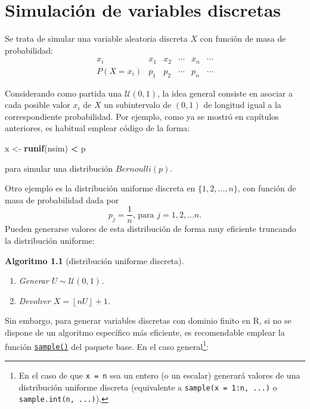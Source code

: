 \documentclass[
  spanish,
  10pt,
]{book}
\newenvironment{Shaded}{\begin{snugshade}}{\end{snugshade}}
\newcommand{\FunctionTok}[1]{\textcolor[rgb]{0.13,0.29,0.53}{\textbf{#1}}}
\newcommand{\NormalTok}[1]{#1}
\newcommand{\OtherTok}[1]{\textcolor[rgb]{0.56,0.35,0.01}{#1}}
\newcommand{\SpecialCharTok}[1]{\textcolor[rgb]{0.81,0.36,0.00}{\textbf{#1}}}
\theoremstyle{break}
\newtheorem{conjecture}{Algoritmo}[chapter]
\theoremstyle{nonumberplain}
\let\oldfootnote\footnote
\renewcommand\footnote[1]{\oldfootnote{\hspace{2mm}#1}}
\begin{document}
\chapter{Simulación de variables discretas}\label{discretas}

Se trata de simular una variable aleatoria discreta \(X\) con función de masa de
probabilidad:
\[\begin{array}{l|ccccc}
 x_{i}  &  x_{1}  &  x_{2}  &  \cdots   &  x_{n}  &  \cdots   \\ \hline
 P\left( X=x_{i}\right)   &  p_{1}  &  p_{2}  &  \cdots   &  p_{n}  &  
\cdots  
\end{array}\]

Considerando como partida una \(\mathcal{U}\left( 0,1\right)\), la
idea general consiste en asociar a cada posible valor \(x_{i}\) de \(X\)
un subintervalo de \(\left( 0,1\right)\) de longitud igual a la correspondiente
probabilidad.
Por ejemplo, como ya se mostró en capítulos anteriores, es habitual emplear
código de la forma:

\begin{Shaded}
\begin{Highlighting}[]
\NormalTok{x }\OtherTok{\textless{}{-}} \FunctionTok{runif}\NormalTok{(nsim) }\SpecialCharTok{\textless{}}\NormalTok{ p}
\end{Highlighting}
\end{Shaded}

para simular una distribución \(Bernoulli(p)\).

Otro ejemplo es la distribución uniforme discreta
en \(\{1,2,\ldots,n\}\), con función de masa de probabilidad dada por
\[p_{j}=\frac{1}{n}\text{, para }j=1,2,\ldots n.\]
Pueden generarse valores de esta distribución de forma muy eficiente truncando la distribución uniforme:

\begin{conjecture}[distribución uniforme discreta]
\protect\hypertarget{cnj:unif-discr}{}\label{cnj:unif-discr}

\begin{enumerate}
\def\labelenumi{\arabic{enumi}.}
\item
  Generar \(U\sim \mathcal{U}\left( 0,1\right)\).
\item
  Devolver \(X=\left\lfloor nU\right\rfloor + 1\).
\end{enumerate}

\end{conjecture}

Sin embargo, para generar variables discretas con dominio finito en R, si no se dispone de un algoritmo específico más eficiente, es recomendable emplear la función \href{https://rdrr.io/r/base/sample.html}{\texttt{sample()}} del paquete base.
En el caso general\footnote{En el caso de que \texttt{x\ =\ n} sea un entero (o un escalar) generará valores de una distribución uniforme discreta (equivalente a \texttt{sample(x\ =\ 1:n,\ ...)} o \texttt{sample.int(n,\ ...)}).}:
\end{document}
